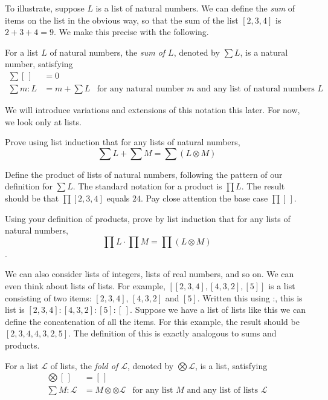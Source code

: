 To illustrate, suppose $L$ is a list of natural numbers. We can define the \emph{sum} of items on the list
in the obvious way, so that the sum of the list $[2,3,4]$ is $2+3+4 = 9$. We make this precise with the following.

\begin{defn}
	For a list $L$ of natural numbers, the \emph{sum of $L$}, denoted by $\sum L$, is a natural number, satisfying
	\begin{align*}
	\sum[\,] &= 0\\
	\sum m:L &= m + \sum L &\text{for any natural number $m$ and any list of natural numbers $L$}
	\end{align*}
\end{defn}

We will introduce variations and extensions of this notation this later. For now, we look only at lists. 

\begin{exercises}
\item Prove using list induction that for any lists of natural numbers,
\[\sum L + \sum M = \sum (L\otimes M)\]
\item Define the product of lists of natural numbers, following the pattern of our definition for $\sum L$. The standard notation
for a product is $\prod L$. The result should be that $\prod[2,3,4]$ equals $24$. Pay close attention the base case $\prod[\,]$.
\item Using your definition of products, prove by list induction that for any lists of natural numbers,
\[\prod L\cdot \prod M = \prod(L\otimes M)\]. 
\end{exercises}

We can also consider lists of integers, lists of real numbers, and so on. We can even think about lists of lists.
For example, $[[2,3,4],[4,3,2],[5]]$ is a list consisting of two items: $[2,3,4]$, $[4,3,2]$ and $[5]$. Written this using
:, this is list is $[2,3,4]:[4,3,2]:[5]:[\,]$. Suppose we have a list of lists like this we can define the
concatenation of all the items. For this example, the result should be $[2,3,4,4,3,2,5]$. The definition of this
is exactly analogous to sums and products.

\begin{defn}
	For a list $\mathcal L$ of lists, the \emph{fold of $\mathcal L$}, denoted by $\bigotimes \mathcal L$, is a list, satisfying
	\begin{align*}
	\bigotimes[\,] &= [\,]\\
	\sum M:\mathcal L &= M \otimes \otimes \mathcal L &\text{for any list $M$ and any list of lists $\mathcal L$}
	\end{align*}
\end{defn}

